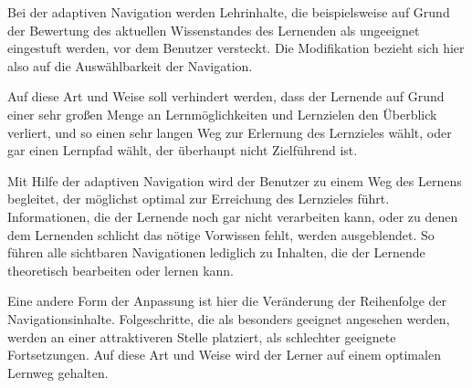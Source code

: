 Bei der adaptiven Navigation werden Lehrinhalte, die beispielsweise auf Grund der Bewertung des aktuellen Wissenstandes des Lernenden
als ungeeignet eingestuft werden, vor dem Benutzer versteckt. Die Modifikation bezieht sich hier also auf die Auswählbarkeit der Navigation.

Auf diese Art und Weise soll verhindert werden, dass der Lernende auf Grund einer sehr großen Menge an
Lernmöglichkeiten und Lernzielen den Überblick verliert, und so einen sehr langen Weg zur Erlernung des Lernzieles wählt,
oder gar einen Lernpfad wählt, der überhaupt nicht Zielführend ist.

Mit Hilfe der adaptiven Navigation wird der Benutzer zu einem Weg des Lernens begleitet, der möglichst optimal
zur Erreichung des Lernzieles führt. Informationen, die der Lernende noch gar nicht verarbeiten kann, oder zu denen dem Lernenden schlicht
das nötige Vorwissen fehlt, werden
ausgeblendet. So führen alle sichtbaren Navigationen lediglich zu Inhalten, die der Lernende theoretisch
bearbeiten oder lernen kann.

Eine andere Form der Anpassung ist hier die Veränderung der Reihenfolge der Navigationsinhalte.
Folgeschritte, die als besonders geeignet angesehen werden, werden an einer attraktiveren Stelle platziert, als
schlechter geeignete Fortsetzungen. Auf diese Art und Weise wird der Lerner auf einem optimalen Lernweg gehalten.
